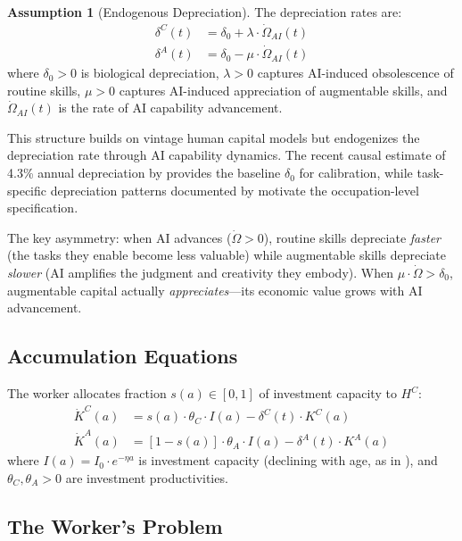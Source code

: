 \documentclass[11pt,a4paper]{article}
\theoremstyle{definition}
\newtheorem{assumption}{Assumption}
\begin{document}
\begin{assumption}[Endogenous Depreciation]
The depreciation rates are:
\begin{align}
\delta^C(t) &= \delta_0 + \lambda \cdot \dot{\Omega}_{AI}(t) \label{eq:delta_c} \\
\delta^A(t) &= \delta_0 - \mu \cdot \dot{\Omega}_{AI}(t) \label{eq:delta_a}
\end{align}
where $\delta_0 > 0$ is biological depreciation, $\lambda > 0$ captures AI-induced obsolescence of routine skills, $\mu > 0$ captures AI-induced appreciation of augmentable skills, and $\dot{\Omega}_{AI}(t)$ is the rate of AI capability advancement.
\end{assumption}

This structure builds on vintage human capital models \citep{chari1991vintage} but endogenizes the depreciation rate through AI capability dynamics. The recent causal estimate of 4.3\% annual depreciation by \citet{dinerstein2022depreciation} provides the baseline $\delta_0$ for calibration, while task-specific depreciation patterns documented by \citet{gathmann2010general} motivate the occupation-level specification.

The key asymmetry: when AI advances ($\dot{\Omega} > 0$), routine skills depreciate \textit{faster} (the tasks they enable become less valuable) while augmentable skills depreciate \textit{slower} (AI amplifies the judgment and creativity they embody). When $\mu \cdot \dot{\Omega} > \delta_0$, augmentable capital actually \textit{appreciates}---its economic value grows with AI advancement.

\subsection{Accumulation Equations}

The worker allocates fraction $s(a) \in [0,1]$ of investment capacity to $H^C$:
\begin{align}
\dot{K}^C(a) &= s(a) \cdot \theta_C \cdot I(a) - \delta^C(t) \cdot K^C(a) \label{eq:accum_c} \\
\dot{K}^A(a) &= [1-s(a)] \cdot \theta_A \cdot I(a) - \delta^A(t) \cdot K^A(a) \label{eq:accum_a}
\end{align}
where $I(a) = I_0 \cdot e^{-\eta a}$ is investment capacity (declining with age, as in \citeauthor{benporath1967production}), and $\theta_C, \theta_A > 0$ are investment productivities.

\subsection{The Worker's Problem}
\end{document}
